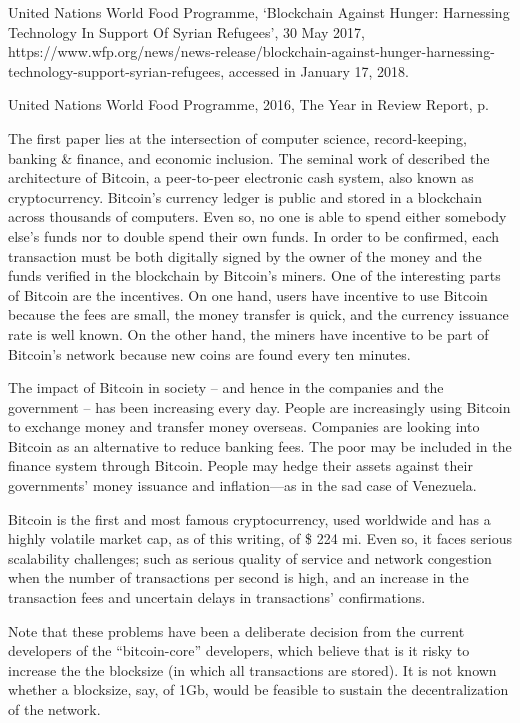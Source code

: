 United Nations World Food Programme, `Blockchain Against Hunger: Harnessing Technology In Support Of Syrian Refugees', 30 May 2017, https://www.wfp.org/news/news-release/blockchain-against-hunger-harnessing-technology-support-syrian-refugees, accessed in January 17, 2018.

United Nations World Food Programme, 2016, The Year in Review Report, p.

The first paper lies at the intersection of computer science, record-keeping, banking \& finance, and economic inclusion. The seminal work of \citet{nakamoto2008bitcoin} described the architecture of Bitcoin, a peer-to-peer electronic cash system, also known as cryptocurrency. Bitcoin's currency ledger is public and stored in a blockchain across thousands of computers. Even so, no one is able to spend either somebody else's funds nor to double spend their own funds. In order to be confirmed, each transaction must be both digitally signed by the owner of the money and the funds verified in the blockchain by Bitcoin's miners. One of the interesting parts of Bitcoin are the incentives. On one hand, users have incentive to use Bitcoin because the fees are small, the money transfer is quick, and the currency issuance rate is well known. On the other hand, the miners have incentive to be part of Bitcoin's network because new coins are found every ten minutes.

The impact of Bitcoin in society -- and hence in the companies and the government -- has been increasing every day. People are increasingly using Bitcoin to exchange money and transfer money overseas. Companies are looking into Bitcoin as an alternative to reduce banking fees. The poor may be included in the finance system through Bitcoin. People may hedge their assets against their governments' money issuance and inflation---as in the sad case of Venezuela.

Bitcoin is the first and most famous cryptocurrency, used worldwide and has a highly volatile market cap, as of this writing, of \$ 224 mi. Even so, it faces serious scalability challenges; such as serious quality of service and network congestion when the number of transactions per second is high, and an increase in the transaction fees and uncertain delays in transactions' confirmations.

Note that these problems have been a deliberate decision from the current developers of the ``bitcoin-core'' developers, which believe that is it risky to increase the the blocksize (in which all transactions are stored).  It is not known whether a blocksize, say, of 1Gb, would be feasible to sustain the decentralization of the network. 

